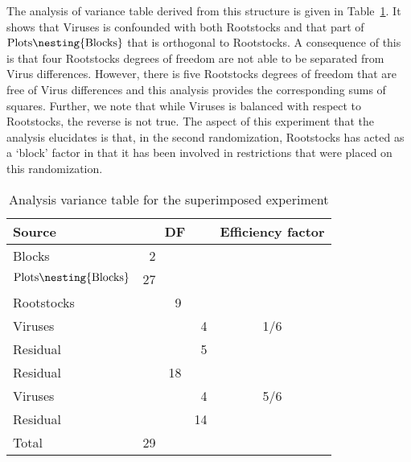 The analysis of variance table derived from this structure is given in 
Table~\ref{tab:ANOVASuper}. It shows that Viruses is confounded with 
both Rootstocks and that part of  $\mbox{Plots} \nesting{\mbox{Blocks}}$ 
that is orthogonal to Rootstocks. A consequence of this is that 
four Rootstocks degrees of freedom are not able to be separated from 
Virus differences. However, there is five Rootstocks degrees of freedom 
that are free of Virus differences and this analysis provides the 
corresponding sums of squares.  Further, we note that while Viruses 
is balanced with respect to Rootstocks, the reverse is not true. 
The aspect of this experiment that the analysis elucidates is that, 
in the second randomization, Rootstocks has acted as a `block' factor 
in that it has been involved in restrictions that were placed on this 
randomization.

\begin{table}[htbp]
\begin{center}
\begin{tabular}{lrrrc}
Source & \multicolumn {3}{c}{DF} & Efficiency factor \\
\hline
Blocks & 2 \\
$\mbox{Plots} \nesting{\mbox{Blocks}}$ & 27\\
\quad Rootstocks & & 9          \\
\qquad Viruses   & & & 4 & 1/6  \\
\qquad Residual  & & & 5        \\
\quad Residual   & & 18         \\
\qquad Viruses   & & & 4 & 5/6  \\
\qquad Residual  & & & 14       \\
\hline
Total            & 29
\end{tabular}
\end{center}
\caption{Analysis variance table for the superimposed experiment}
\label{tab:ANOVASuper}
\end{table}